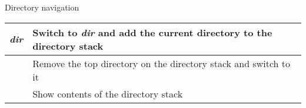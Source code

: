 \begin{block}{Directory navigation}
  \begin{tabu} to 0.9\linewidth { X X[4] }
     \textit{dir} & Switch to \textit{dir} and add the current directory to \linebreak the directory stack \\ \hline
     & Remove the top directory on the directory stack and switch to it \\ \hline
     & Show contents of the directory stack
  \end{tabu}
\end{block}
